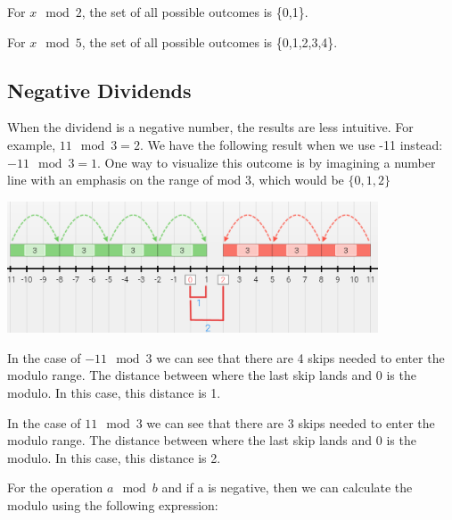 \documentclass{article}
\begin{document}
\par\noindent For \(x \mod 2\), the set of all possible outcomes is \{0,1\}.

\par\noindent For \(x \mod 5\), the set of all possible outcomes is \{0,1,2,3,4\}.

\subsection{Negative Dividends}

\par When the dividend is a negative number, the results are less intuitive. For example, \(11\mod 3=2\). We have the following result when we use -11 instead: \(-11\mod3=1\). One way to visualize this outcome is by imagining a number line with an emphasis on the range of mod 3, which would be \(\{0,1,2\}\)
\newline
\newline
\newline
	\begin{center}
	\includegraphics[width=11cm]{mod-num-line.png}
\end{center}
\begin{minipage}[c]{.5\linewidth}

	\par\noindent In the case of \(-11 \mod 3\) we can see that there are 4 skips needed to enter the modulo range. The distance between where the last skip lands and 0 is the modulo. In this case, this distance is 1.

\end{minipage}%
\begin{minipage}[c]{.5\linewidth}
	\par\noindent In the case of \(11 \mod 3\) we can see that there are 3 skips needed to enter the modulo range. The distance between where the last skip lands and 0 is the modulo. In this case, this distance is 2.
\end{minipage}
\linebreak
\linebreak
\par\noindent For the operation \(a \mod b\) and if a is negative, then we can calculate the modulo using the following expression:
\end{document}

